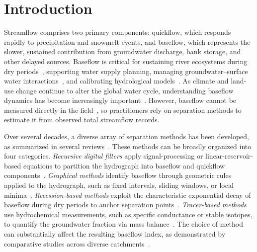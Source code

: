 \documentclass[hydrology,article,submit,pdftex,moreauthors]{Definitions/mdpi}
\begin{document}
\section{Introduction}
\label{sec:introduction}

Streamflow comprises two primary components: quickflow, which responds rapidly to precipitation and snowmelt events, and baseflow, which represents the slower, sustained contribution from groundwater discharge, bank storage, and other delayed sources. Baseflow is critical for sustaining river ecosystems during dry periods~\cite{Smakhtin2001}, supporting water supply planning, managing groundwater--surface water interactions~\cite{Barlow2012}, and calibrating hydrological models~\cite{ChapmanMaxwell1996,Eckhardt2005}. As climate and land-use change continue to alter the global water cycle, understanding baseflow dynamics has become increasingly important~\cite{Tan2020}. However, baseflow cannot be measured directly in the field~\cite{ChapmanMaxwell1996}, so practitioners rely on separation methods to estimate it from observed total streamflow records.

Over several decades, a diverse array of separation methods has been developed, as summarized in several reviews~\cite{Tallaksen1995,McMahon2021}. These methods can be broadly organized into four categories. \textit{Recursive digital filters} apply signal-processing or linear-reservoir-based equations to partition the hydrograph into baseflow and quickflow components~\cite{Lyne1979,Nathan1990,Chapman1991,Eckhardt2005}. \textit{Graphical methods} identify baseflow through geometric rules applied to the hydrograph, such as fixed intervals, sliding windows, or local minima~\cite{Sloto1996}. \textit{Recession-based methods} exploit the characteristic exponential decay of baseflow during dry periods to anchor separation points~\cite{Tallaksen1995,Rutledge1998}. \textit{Tracer-based methods} use hydrochemical measurements, such as specific conductance or stable isotopes, to quantify the groundwater fraction via mass balance~\cite{Stewart2007,Klaus2013}. The choice of method can substantially affect the resulting baseflow index, as demonstrated by comparative studies across diverse catchments~\cite{Eckhardt2008,Lott2016}.
\end{document}
